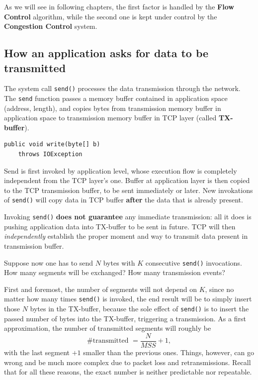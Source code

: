 \documentclass[10pt]{book}
\begin{document}
As we will see in following chapters, the first factor is handled by the
\textbf{Flow Control} algorithm, while the second one is kept under control by
the \textbf{Congestion Control} system.

\subsection{How an application asks for data to be transmitted}

The system call \texttt{send()} processes the data transmission through the
network. The \texttt{send} function passes a memory buffer contained in
application space (address, length), and copies bytes from transmission memory
buffer in application space to transmission memory buffer in TCP layer (called
\textbf{TX-buffer}).

\begin{lstlisting}
public void write(byte[] b)
	throws IOException
\end{lstlisting}

Send is first invoked by application level, whose execution flow is completely
independent from the TCP layer's one. Buffer at application layer is then
copied to the TCP transmission buffer, to be sent immediately or later. New
invokations of \texttt{send()} will copy data in TCP buffer \textbf{after} the
data that is already present.

Invoking \texttt{send()} \textbf{does not guarantee} any immediate
transmission: all it does is pushing application data into TX-buffer to be sent
in future. TCP will then \emph{independently} establish the proper moment and
way to transmit data present in transmission buffer.

Suppose now one has to send $N$ bytes with $K$ consecutive \texttt{send()}
invocations. How many segments will be exchanged? How many transmission events?

First and foremost, the number of segments will not depend on $K$, since no
matter how many times \texttt{send()} is invoked, the end result will be to simply
insert those $N$ bytes in the TX-buffer, because the sole effect of
\texttt{send()} is to insert the passed number of bytes into the TX-buffer,
triggering a transmission. As a first approximation, the number of transmitted
segments will roughly be $$\mbox{\#transmitted } = \frac{N}{MSS} + 1,$$ with
the last segment $+1$ smaller than the previous ones. Things, however, can go
wrong and be much more complex due to packet loss and retransmissions. Recall
that for all these reasons, the exact number is neither predictable nor
repeatable.
\end{document}
